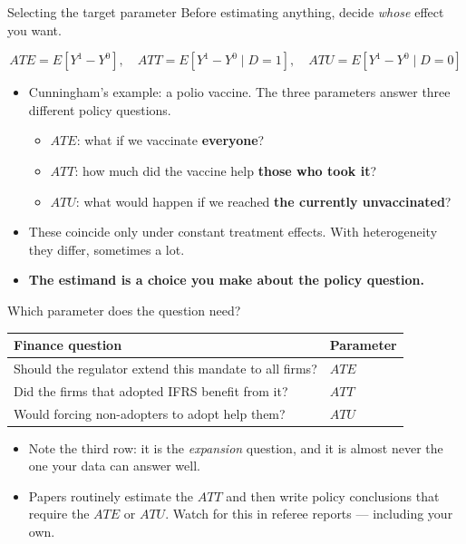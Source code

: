 \documentclass[
  11pt,
  ignorenonframetext,
  aspectratio=169,
]{beamer}
\providecommand{\tightlist}{%
  \setlength{\itemsep}{0pt}\setlength{\parskip}{0pt}}
\begin{document}
\begin{frame}{Selecting the target parameter}
\protect{}\label{selecting-the-target-parameter}
Before estimating anything, decide \emph{whose} effect you want.

\[
ATE = E[Y^1 - Y^0], \quad
ATT = E[Y^1 - Y^0 \mid D{=}1], \quad
ATU = E[Y^1 - Y^0 \mid D{=}0]
\]

\begin{itemize}
\tightlist
\item
  Cunningham's example: a polio vaccine. The three parameters answer
  three different policy questions.

  \begin{itemize}
  \tightlist
  \item
    \(ATE\): what if we vaccinate \textbf{everyone}?
  \item
    \(ATT\): how much did the vaccine help \textbf{those who took it}?
  \item
    \(ATU\): what would happen if we reached \textbf{the currently
    unvaccinated}?
  \end{itemize}
\item
  These coincide only under constant treatment effects. With
  heterogeneity they differ, sometimes a lot.
\item
  \textbf{The estimand is a choice you make about the policy question.}
\end{itemize}
\end{frame}

\begin{frame}{Which parameter does the question need?}
\protect{}\label{which-parameter-does-the-question-need}
\begin{center}
\begin{tabular}{p{5.6cm}l}
\toprule
Finance question & Parameter \\
\midrule
Should the regulator extend this mandate to all firms? & $ATE$ \\
Did the firms that adopted IFRS benefit from it? & $ATT$ \\
Would forcing non-adopters to adopt help them? & $ATU$ \\
\bottomrule
\end{tabular}
\end{center}

\vspace{0.4em}

\begin{itemize}
\tightlist
\item
  Note the third row: it is the \emph{expansion} question, and it is
  almost never the one your data can answer well.
\item
  Papers routinely estimate the \(ATT\) and then write policy
  conclusions that require the \(ATE\) or \(ATU\). Watch for this in
  referee reports --- including your own.
\end{itemize}
\end{frame}
\end{document}
